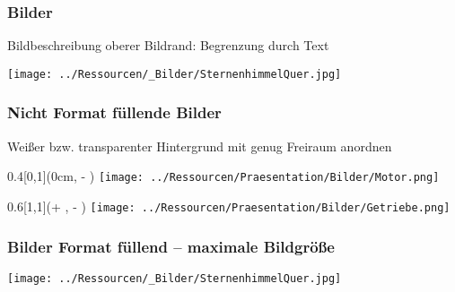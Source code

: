 \begin{frame}
    \frametitle{Bilder}

    Bildbeschreibung\newline
    oberer Bildrand: Begrenzung durch Text

\vspace*{-3mm}
\begin{minipage}[t][0cm]{\paperwidth}%
\hspace*{-\PraesentationSeitenrand}%
\texttt{[image: ../Ressourcen/\_Bilder/SternenhimmelQuer.jpg]}
\end{minipage}

\end{frame}
\clearpage


\begin{frame}
    \frametitle{Nicht Format füllende Bilder}
    
    Weißer bzw. transparenter Hintergrund\newline
    mit genug Freiraum anordnen


\begin{textblock*}{0.4\paperwidth}[0,1](0cm, \textheight - \PraesentationSeitenrand)%
\texttt{[image: ../Ressourcen/Praesentation/Bilder/Motor.png]}
\end{textblock*}

\begin{textblock*}{0.6\paperwidth}[1,1](\textwidth + \PraesentationSeitenrand, \textheight - \PraesentationSeitenrand)%
\texttt{[image: ../Ressourcen/Praesentation/Bilder/Getriebe.png]}
\end{textblock*}

\end{frame}
\clearpage


\begin{frame}
    \frametitle{Bilder Format füllend -- maximale Bildgröße}

\begin{minipage}[t][0cm]{\paperwidth}%
\hspace*{-\PraesentationSeitenrand}%
\texttt{[image: ../Ressourcen/\_Bilder/SternenhimmelQuer.jpg]}
\end{minipage}
    
\end{frame}
\clearpage


